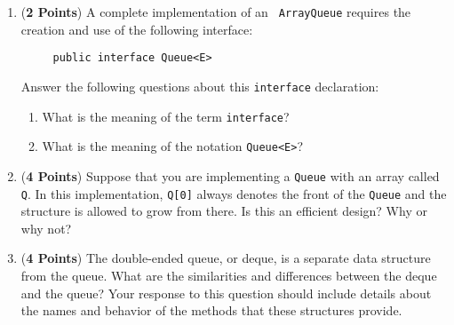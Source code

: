 \documentclass[12pt]{article}
\begin{document}
\begin{enumerate}
\begin{enumerate}
\item ({\bf 2 Points}) A complete implementation of an {\tt
  ArrayQueue} requires the creation and use of the following
  interface:
  
  \vspace*{-.1in}

  \begin{verbatim}
     public interface Queue<E> 
  \end{verbatim}

  \vspace*{-.3in}

  \noindent
  Answer the following questions about this {\tt interface}
  declaration:

  \begin{enumerate}

    \item What is the meaning of the term {\tt interface}?

    \item What is the meaning of the notation {\tt Queue<E>}?
    
  \end{enumerate}

\item ({\bf 4 Points}) Suppose that you are implementing a {\tt Queue}
  with an array called {\tt Q}.  In this implementation, {\tt Q[0]}
  always denotes the front of the {\tt Queue} and the structure is
  allowed to grow from there.  Is this an efficient design? Why or why
  not?

\item ({\bf 4 Points}) The double-ended queue, or deque, is a separate
  data structure from the queue.  What are the similarities and
  differences between the deque and the queue?  Your response to this
  question should include details about the names and behavior of the
  methods that these structures provide.


\end{enumerate}

\end{enumerate}
\end{document}
